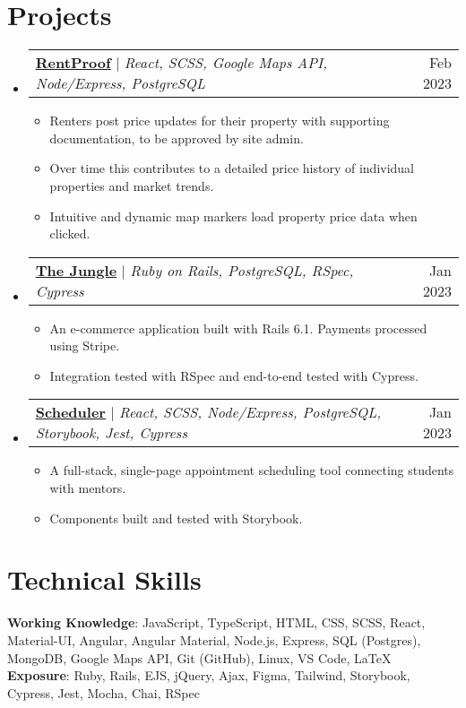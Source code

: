 \documentclass[letterpaper,11pt]{article}
\makeatletter
\newcommand{\resumeItem}[1]{
  \item\small{
    {#1 \vspace{-2pt}}
  }
}
\newcommand{\resumeProjectHeading}[2]{
    \item
    \begin{tabular*}{0.97\textwidth}{l@{\extracolsep{\fill}}r}
      \small#1 & #2 \\
    \end{tabular*}\vspace{-7pt}
}
\newcommand{\resumeSubHeadingListStart}{\begin{itemize}[leftmargin=0.15in, label={}]}
\newcommand{\resumeSubHeadingListEnd}{\end{itemize}}
\newcommand{\resumeItemListStart}{\begin{itemize}}
\newcommand{\resumeItemListEnd}{\end{itemize}\vspace{-5pt}}
\makeatother
\begin{document}
\section{Projects}
    \resumeSubHeadingListStart
      \resumeProjectHeading
          {\href{https://github.com/JackDuluoz/RentProof}{\textbf{\underline{RentProof}}} $|$ \emph{React, SCSS, Google Maps API, Node/Express, PostgreSQL}}{Feb 2023}
          \resumeItemListStart
            \resumeItem{Renters post price updates for their property with supporting documentation, to be approved by site admin.}
            \resumeItem{Over time this contributes to a detailed price history of individual properties and market trends.}
            \resumeItem{Intuitive and dynamic map markers load property price data when clicked.}
          \resumeItemListEnd
      \resumeProjectHeading
          {\href{https://github.com/JackDuluoz/jungle-rails}
          {\textbf{\underline{The Jungle}}} $|$ \emph{Ruby on Rails, PostgreSQL, RSpec, Cypress}}{Jan 2023}
          \resumeItemListStart
            \resumeItem{An e-commerce application built with Rails 6.1. Payments processed using Stripe.}
            \resumeItem{Integration tested with RSpec and end-to-end tested with Cypress.}
          \resumeItemListEnd
      \resumeProjectHeading
          {\href{https://github.com/JackDuluoz/scheduler}
          {\textbf{\underline{Scheduler}}} $|$ \emph{React, SCSS, Node/Express, PostgreSQL, Storybook, Jest, Cypress}}{Jan 2023}
          \resumeItemListStart
            \resumeItem{A full-stack, single-page appointment scheduling tool connecting students with mentors.}
            \resumeItem{Components built and tested with Storybook.}
          \resumeItemListEnd
    \resumeSubHeadingListEnd



%
\section{Technical Skills}
 \begin{itemize}[leftmargin=0.15in, label={}]
    \small{\item{
     \textbf{Working Knowledge}{: JavaScript, TypeScript, HTML, CSS, SCSS, React, Material-UI, Angular, Angular Material, Node.js, Express, SQL (Postgres), MongoDB, Google Maps API, Git (GitHub), Linux, VS Code, LaTeX} \\
     \textbf{Exposure}{: Ruby, Rails, EJS, jQuery, Ajax, Figma, Tailwind, Storybook, Cypress, Jest, Mocha, Chai, RSpec} \\
    }}
 \end{itemize}


\end{document}
